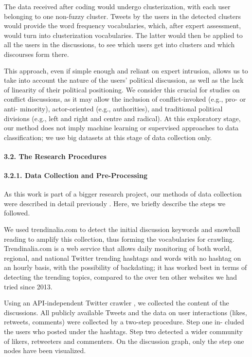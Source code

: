 The data received after coding would undergo clusterization, with each user belonging to one non-fuzzy cluster. Tweets by the users in the detected clusters would provide the word frequency vocabularies, which, after expert assessment, would turn into clusterization vocabularies. The latter would then be applied to all the users in the discussions, to see which users get into clusters and which discourses form there.

This approach, even if simple enough and reliant on expert intrusion, allows us to take into account the nature of the users’ political discussion, as well as the lack of linearity of their political positioning. We consider this crucial for studies on conflict discussions, as it may allow the inclusion of conflict-invoked (e.g., pro- or anti- minority), actor-oriented (e.g., authorities), and traditional political divisions (e.g., left and right and centre and radical). At this exploratory stage, our method does not imply machine learning or supervised approaches to data classification; we use big datasets at this stage of data collection only.

\paragraph{3.2. The Research Procedures}

\paragraph{3.2.1. Data Collection and Pre-Processing}

As this work is part of a bigger research project, our methods of data collection were described in detail previously \cite{BodrunovaLitvinenkoBlekanov2017}. Here, we briefly describe the steps we followed.

We used trendinalia.com to detect the initial discussion keywords and snowball reading to amplify this collection, thus forming the vocabularies for crawling. Trendinalia.com is a web service that allows daily monitoring of both world, regional, and national Twitter trending hashtags and words with no hashtag on an hourly basis, with the possibility of backdating; it has worked best in terms of detecting the trending topics, compared to the over ten other websites we had tried since 2013.

Using an API-independent Twitter crawler \cite{BlekanovSergeevMartynenko}, we collected the content of the discussions. All publicly available Tweets and the data on user interactions (likes, retweets, comments) were collected by a two-step procedure. Step one in- cluded the users who posted under the hashtags. Step two detected a wider community of likers, retweeters and commenters. On the discussion graph, only the step one nodes have been visualized.

